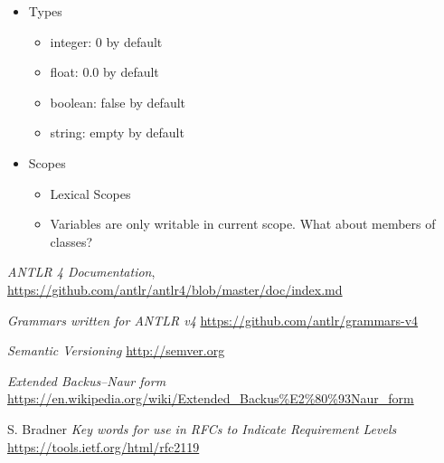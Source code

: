 \documentclass[a4paper,12pt]{report}
\begin{document}

\begin{itemize}
    \item Types
    \begin{itemize}
        \item integer: 0 by default
        \item float: 0.0 by default
        \item boolean: false by default
        \item string: empty by default
    \end{itemize} 
    \item Scopes
    \begin{itemize}
        \item Lexical Scopes
        \item Variables are only writable in current scope. What about members of classes?
    \end{itemize}
\end{itemize}

\clearpage

\begin{thebibliography}{100}

    \textit{ANTLR 4 Documentation},
    \url{https://github.com/antlr/antlr4/blob/master/doc/index.md}

    \textit{Grammars written for ANTLR v4}
    \url{https://github.com/antlr/grammars-v4}

    \textit{Semantic Versioning}
    \url{http://semver.org}

    \textit{Extended Backus–Naur form}
    \url{https://en.wikipedia.org/wiki/Extended_Backus\%E2\%80\%93Naur_form}

    S. Bradner
    \textit{Key words for use in RFCs to Indicate Requirement Levels}
    \url{https://tools.ietf.org/html/rfc2119}

\end{thebibliography}
\end{document}
